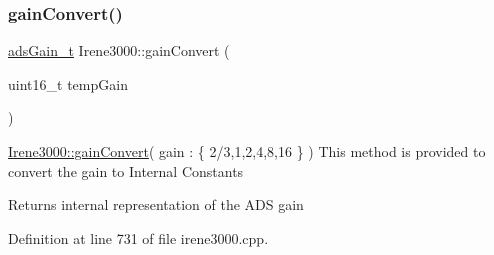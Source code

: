 \subsubsection{\texorpdfstring{gain\+Convert()}{gainConvert()}}
{\footnotesize\ttfamily \hyperlink{_cool_adafruit___a_d_s1015_8h_a3d6c0e15829a207b9155890811fa4781}{ads\+Gain\+\_\+t} Irene3000\+::gain\+Convert (\begin{DoxyParamCaption}\item[{uint16\+\_\+t}]{temp\+Gain }\end{DoxyParamCaption})}

\hyperlink{class_irene3000_abcad62d1201a59f8dd3ba87048002728}{Irene3000\+::gain\+Convert}( gain \+: \{ 2/3,1,2,4,8,16 \} ) This method is provided to convert the gain to Internal Constants

\begin{DoxyReturn}{Returns}
internal representation of the A\+DS gain 
\end{DoxyReturn}


Definition at line 731 of file irene3000.\+cpp.


